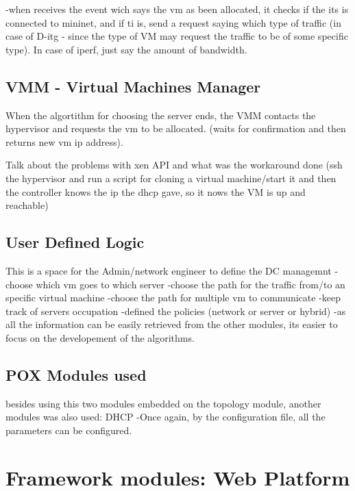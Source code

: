 \documentclass[12pt,english,oneside]{book}
\begin{document}
-when receives the event wich says the vm as been allocated, it checks if the its is connected to mininet, and if ti is, send a request saying which type of traffic (in case of D-itg - since the type of VM may request the traffic to be of some specific type). In case of iperf, just say the amount of bandwidth.

\subsection{VMM - Virtual Machines Manager}
\hspace{0.6cm}

When the algortithm for choosing the server ends, the VMM contacts the hypervisor and requests the vm to be allocated. (waits for confirmation and then returns new vm ip address).

Talk about the problems with xen API and what was the workaround done (ssh the hypervisor and run a script for cloning a virtual machine/start it and then the controller knows the ip the dhcp gave, so it nows the VM is up and reachable)

\subsection{User Defined Logic}
\hspace{0.6cm}
 
This is a space for the Admin/network engineer to define the DC managemnt
-choose which vm goes to which server
-choose the path for the traffic from/to an specific virtual machine
-choose the path for multiple vm to communicate
-keep track of servers occupation
-defined the policies (network or server or hybrid)
-as all the information can be easily retrieved from the other modules, its easier to focus on the developement of the algorithms.

\subsection{POX Modules used}
\hspace{0.6cm}

besides using this two modules embedded on the topology module, another modules was also used: DHCP
-Once again, by the configuration file, all the parameters can be configured.

\newpage

\section{Framework modules: Web Platform}
\hspace{0.6cm}
\end{document}
